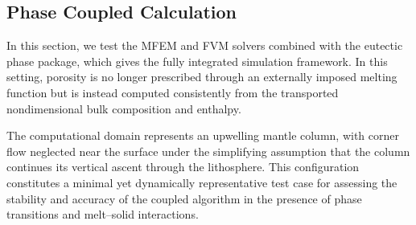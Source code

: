 \clearpage

\subsection{Phase Coupled Calculation}
\label{sec:phasecoupled}

In this section, we test the MFEM and FVM solvers combined with the eutectic phase package, which gives the 
fully integrated simulation framework. In this setting, porosity is no longer prescribed through an externally 
imposed melting function but is instead computed consistently from the transported nondimensional bulk composition and enthalpy. 

The computational domain represents an upwelling mantle column, with corner flow neglected near the surface under the 
simplifying assumption that the column continues its vertical ascent through the lithosphere. This configuration constitutes 
a minimal yet dynamically representative test case for assessing the stability and accuracy of the coupled algorithm in the 
presence of phase transitions and melt–solid interactions.

